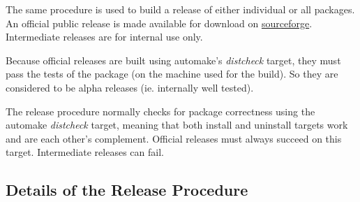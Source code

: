 \documentclass[12pt]{article}
\begin{document}
The same procedure is used to build a release of either individual or all packages. An official public release is made available for download on \href{http://sourceforge.net/projects/neurospaces/}{sourceforge}. Intermediate releases are for internal use only.

Because official releases are built using automake's {\it distcheck} target, they must pass the tests of the package (on the machine used for the build). So they are considered to be alpha releases (ie. internally well tested).

The release procedure normally checks for package correctness using the automake {\it distcheck} target, meaning that both install and uninstall targets work and are each other's complement. Official releases must always succeed on this target. Intermediate releases can fail.

\subsection*{Details of the Release Procedure}
\end{document}
